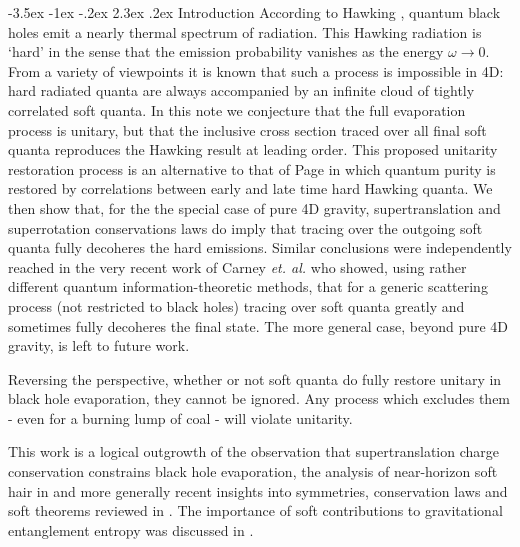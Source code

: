 \documentclass[12pt]{article}
\makeatletter
\numberwithin{equation}{section}
\renewcommand\section{\@startsection {section}{1}{\z@}%
                                   {-3.5ex \@plus -1ex \@minus -.2ex}%
                                   {2.3ex \@plus.2ex}%
                                   {\normalfont\large\bfseries}}
\makeatother
\begin{document}
\tableofcontents
\section{Introduction}
According to Hawking \cite{Hawking:1974sw}, quantum black holes emit a nearly thermal spectrum of radiation. This Hawking radiation is `hard' in the sense that the emission probability vanishes as the energy $ \omega \to 0$. From a variety of viewpoints it is known that such a process is impossible in 4D: hard radiated quanta are always accompanied by an infinite cloud of tightly correlated soft quanta. In this note we conjecture that the full evaporation process is unitary, but that the inclusive cross section 
traced over all final soft quanta reproduces the Hawking result at leading order. This proposed unitarity restoration process is an alternative to that of Page \cite{Page:1979tc} in which quantum purity  is restored by correlations between early and late time hard Hawking quanta. We then show that, for the the special case of pure 4D gravity, supertranslation and superrotation conservations laws do imply that tracing over the outgoing soft quanta fully decoheres  the  hard emissions.  Similar conclusions were independently reached in the very recent work of 
Carney {\it et. al.} \cite{Carney:2017jut} who showed, using rather different quantum information-theoretic  methods,  that for  a generic scattering process (not restricted to black holes) tracing over soft quanta greatly and sometimes fully decoheres the final state. The more general case, beyond pure 4D gravity, is left to future work. 

Reversing  the perspective, whether or not soft quanta do fully restore unitary in black hole evaporation, they cannot be ignored. Any process which excludes them - even for a burning lump of coal - will violate unitarity. 


This work is a logical outgrowth of the observation \cite{Strominger:2014pwa} that supertranslation charge conservation constrains black hole evaporation,  the analysis of near-horizon soft hair in \cite{hps,Hawking:2016sgy}  and more generally recent insights into symmetries, conservation laws and soft theorems reviewed in \cite{Strominger:2017zoo}. The importance of soft contributions to gravitational entanglement entropy was discussed in \cite{Kapec:2016aqd}. 
\end{document}
